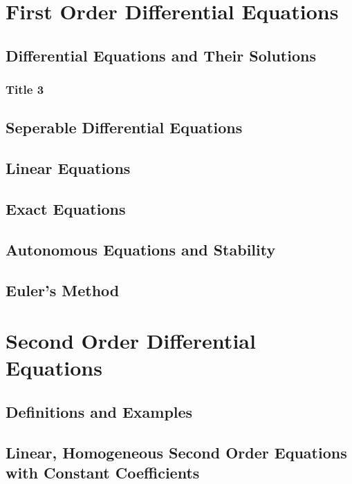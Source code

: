 \documentclass{package/notes}
\begin{document}
\chapter{First Order Differential Equations}

\section{Differential Equations and Their Solutions}
\subsection{Title 3}

\section{Seperable Differential Equations}

\section{Linear Equations}

\section{Exact Equations}

\section{Autonomous Equations and Stability}

\section{Euler's Method}



\chapter{Second Order Differential Equations}

\section{Definitions and Examples}

\section{Linear, Homogeneous Second Order Equations with Constant Coefficients}
\end{document}
